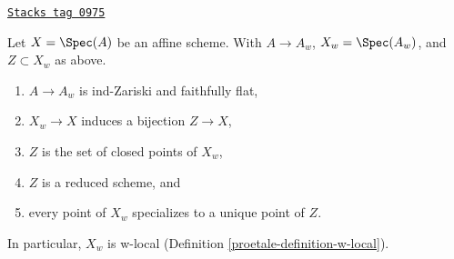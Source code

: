 \begin{lemma}
\label{proetale-lemma-make-w-local}
\href{https://stacks.math.columbia.edu/tag/0975}{\texttt{Stacks tag 0975}}

Let $X = \Spec(A)$ be an affine scheme. With $A \to A_w$, $X_w = \Spec(A_w)$,
and $Z \subset X_w$ as above.
\begin{enumerate}
\item $A \to A_w$ is ind-Zariski and faithfully flat,
\item $X_w \to X$ induces a bijection $Z \to X$,
\item $Z$ is the set of closed points of $X_w$,
\item $Z$ is a reduced scheme, and
\item every point of $X_w$ specializes to a unique point of $Z$.
\end{enumerate}
In particular, $X_w$ is w-local (Definition \ref{proetale-definition-w-local}).
\end{lemma}

